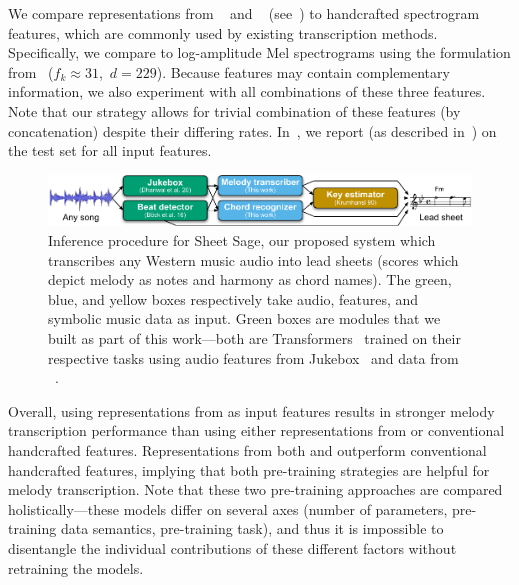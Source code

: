 We compare representations from \jukebox~\cite{dhariwal2020jukebox} and \mtthree~\cite{gardner2021mt3} (see~) to handcrafted spectrogram features, 
which are commonly used by existing transcription methods.
Specifically, we compare to log-amplitude Mel spectrograms using the formulation from~\cite{hawthorne2017onsets} (${f_k \approx 31}$,~${d = 229}$). 
Because features may contain complementary information, we also experiment with all combinations of these three features. 
Note that our \beatpooling{} strategy allows for trivial combination of these features (by concatenation) despite their differing rates. 
In~, we report \fone{} (as described in~) on the \hooktheory{} test set for all input features.


\begin{figure}
    \centering
    \includegraphics[width=\linewidth]{figs/sheetsage.pdf}
    \caption{
    Inference procedure for Sheet Sage, our proposed system which transcribes any Western music audio into lead sheets (scores which depict melody as notes and harmony as chord names). The green, blue, and yellow boxes respectively take audio, features, and symbolic music data as input. Green boxes are modules that we built as part of this work---both are Transformers~\cite{vaswani2017attention} trained on their respective tasks using audio features from Jukebox~\cite{dhariwal2020jukebox} and data from \hooktheory~\cite{hooktheory}.}
    \label{fig:sheet_sage}
\end{figure}

Overall, using representations from \jukebox{} as input features results in stronger melody transcription performance than using either representations from \mtthree{} or conventional handcrafted features. 
Representations from both \mtthree{} and \jukebox{} outperform conventional handcrafted features, 
implying that both pre-training strategies are helpful for melody transcription. 
Note that these two pre-training approaches are compared holistically---these models differ on several axes 
(number of parameters, 
pre-training data semantics, 
pre-training task), 
and thus it is impossible to disentangle the individual contributions of these different factors without retraining the models. 

